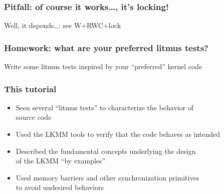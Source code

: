 \documentclass[usenames,dvipsnames]{beamer}
\begin{document}
\begin{frame}[fragile]
\frametitle{Pitfall: of course it works\dots, it's locking!}

\begin{center}
Well, it depends\dots: see W+RWC+lock
\end{center}

\end{frame}


\begin{frame}[fragile]
\frametitle{Homework: what are your preferred litmus tests?}

Write some litmus tests inspired by your ``preferred'' kernel code

\end{frame}


\begin{frame}[fragile]
\frametitle{This tutorial}

\begin{itemize}
	\item Seen several ``litmus tests'' to characterize the behavior
	of \\ source code

\vspace{2mm}
	\item Used the LKMM tools to verify that the code behaves as intended

\vspace{2mm}
	\item Described the fundamental concepts underlying the design \\
	of the LKMM ``by examples''

\vspace{2mm}
	\item Used memory barriers and other synchronization primitives \\
	to avoid undesired behaviors
\end{itemize}

\end{frame}
\end{document}
